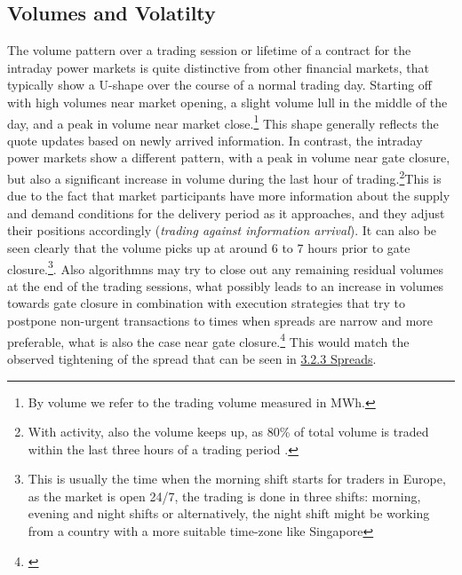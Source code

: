 \documentclass[12pt,a4paper]{cau_thesis}
\begin{document}
\subsection{Volumes and Volatilty}\label{sub_sec:volumes_and_volatility}
The volume pattern over a trading session or lifetime of a contract
for the intraday power markets is quite distinctive from other
financial markets, that typically show a U-shape over the course of a
normal trading day. Starting off with high volumes near market
opening, a slight volume lull in the middle of the day, and a peak in
volume near market close.\footnote{By volume we refer to the trading
    volume measured in MWh.} This shape generally reflects the quote
updates based on newly arrived information. In contrast, the intraday
power markets show a different pattern, with a peak in volume near
gate closure, but also a significant increase in volume during the
last hour of trading.\footnote{With activity, also the volume keeps
    up, as 80\% of total volume is traded within the last three hours of
    a trading period \cite[See ][, p.238]{balardy2022empirical}.}This is
due to the fact that market participants have more information about
the supply and demand conditions for the delivery period as it
approaches, and they adjust their positions accordingly
(\textit{trading against information arrival}). It can also be seen
clearly that the volume picks up at around 6 to 7 hours prior to gate
closure.\footnote{This is usually the time when the morning shift
    starts for traders in Europe, as the market is open 24/7, the trading
    is done in three shifts: morning, evening and night shifts or
    alternatively, the night shift might be working from a country with a
    more suitable time-zone like Singapore}. Also algorithmns may try to
close out any remaining residual volumes at the end of the trading
sessions, what possibly leads to an increase in volumes towards gate
closure in combination with execution strategies that try to postpone
non-urgent transactions to times when spreads are narrow and more
preferable, what is also the case near gate
closure.\footnote{\cite[See ][, p.66]{cartea2015algorithmic}} This
would match the observed tightening of the spread that can be seen in
\hyperref[sub_sec:spreads]{3.2.3 Spreads}.
\begin{figure}[htbp]
    \vspace*{0.5cm}
    \centering
    \label{fig:volume_distribution_heatmap}
\end{figure}
\end{document}
